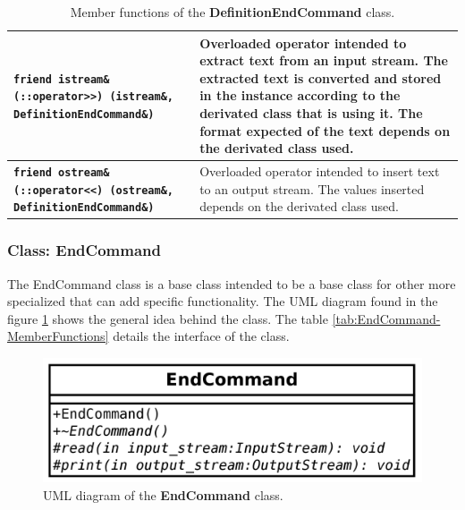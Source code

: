 \documentclass[11pt,twoside,openany,x11names,svgnames]{memoir}
\begin{document}
\begin{table}[h]
\begin{tabular}{| >{\bfseries}p{8.5cm} | p{7cm} |}
	\hline
	
	\texttt{friend istream\& (::operator>>) (istream\&, DefinitionEndCommand\&)} & Overloaded operator intended to extract text from an input stream. The extracted text is converted and stored in the instance according to the derivated class that is using it. The format expected of the text depends on the derivated class used. \\
	
	\hline
	
	\texttt{friend ostream\& (::operator<<) (ostream\&, DefinitionEndCommand\&)} & Overloaded operator intended to insert text to an output stream. The values inserted depends on the derivated class used. \\	
	
	\hline
\end{tabular}
\caption{Member functions of the \textbf{DefinitionEndCommand} class.}
\label{tab:DefinitionEndCommand-MemberFunctions}
\end{table}

\clearpage

\subsubsection{Class: EndCommand}\label{Class-EndCommand}

The EndCommand class is a base class intended to be a base class for other more specialized that can add specific functionality. The UML diagram found in the figure \ref{fig:class-end-command} shows the general idea behind the class. The table \ref{tab:EndCommand-MemberFunctions} details the interface of the class.

\begin{figure}
	\centering
	\includegraphics[scale=0.2, clip=true, trim= 0pt 0pt 0pt 0pt]{images/chapter03-image29}
	\caption{UML diagram of the \textbf{EndCommand} class.}
	\label{fig:class-end-command}
\end{figure}
\end{document}
